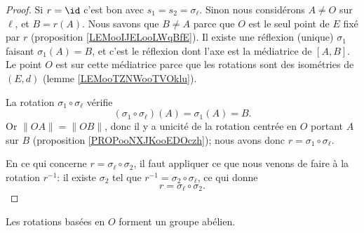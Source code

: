 \begin{proof}
    Si \( r=\id\) c'est bon avec \( s_1=s_2=\sigma_{\ell}\). Sinon nous considérons \( A\neq O\) sur \( \ell\), et \( B=r(A)\). Nous savons que \( B\neq A\) parce que \( O\) est le seul point de \( E\) fixé par \( r\) (proposition \ref{LEMooIJELooLWqBfE}). Il existe une réflexion (unique) \( \sigma_1\) faisant \( \sigma_1(A)=B\), et c'est le réflexion dont l'axe est la médiatrice de \( [A,B]\). Le point \( O\) est sur cette médiatrice parce que les rotations sont des isométries de \( (E,d)\) (lemme \ref{LEMooTZNWooTVOklu}).

    La rotation \( \sigma_1\circ \sigma_{\ell}\) vérifie
    \begin{equation}
        (\sigma_1\circ\sigma_{\ell})(A)=\sigma_1(A)=B.
    \end{equation}
    Or \( \| OA \|=\| OB \|\), donc il y a unicité de la rotation centrée en \( O\) portant \( A\) sur \( B\) (proposition \ref{PROPooNXJKooEDOczh}); nous avons donc \( r=\sigma_1\circ\sigma_{\ell}\).

    En ce qui concerne \( r=\sigma_{\ell}\circ\sigma_2\), il faut appliquer ce que nous venons de faire à la rotation \( r^{-1}\): il existe \( \sigma_2\) tel que \( r^{-1}=\sigma_2\circ\sigma_{\ell}\), ce qui donne
    \begin{equation}
        r=\sigma_{\ell}\circ\sigma_2.
    \end{equation}
\end{proof}

\begin{proposition}      \label{PROPooWMESooNJMdxf}
    Les rotations basées en \( O\) forment un groupe abélien.
\end{proposition}

